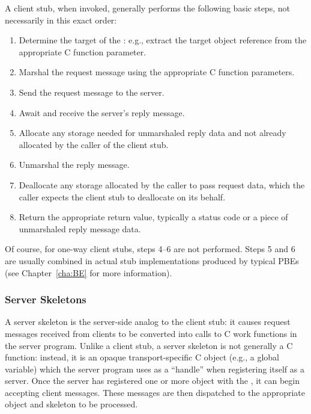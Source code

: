 A client stub, when invoked, generally performs the following basic steps, not
necessarily in this exact order:

\begin{enumerate}
  \item Determine the target of the \RPC{}: e.g., extract the target object
  reference from the appropriate C function parameter.

  \item Marshal the request message using the appropriate C function
  parameters.

  \item Send the request message to the server.

  \item Await and receive the server's reply message.

  \item Allocate any storage needed for unmarshaled reply data and not already
  allocated by the caller of the client stub.

  \item Unmarshal the reply message.

  \item Deallocate any storage allocated by the caller to pass request data,
  which the caller expects the client stub to deallocate on its behalf.

  \item Return the appropriate return value, typically a status code or a piece
  of unmarshaled reply message data.
\end{enumerate}

Of course, for one-way client stubs, steps 4--6 are not performed.  Steps 5 and
6 are usually combined in actual stub implementations produced by typical PBEs
(see Chapter~\ref{cha:BE} for more information).



\subsubsection{Server Skeletons}

A server skeleton is the server-side analog to the client stub: it causes
request messages received from clients to be converted into calls to C work
functions in the server program.  Unlike a client stub, a server skeleton is
not generally a C function: instead, it is an opaque transport-specific C
object (e.g., a global variable) which the server program uses as a ``handle''
when registering itself as a server.  Once the server has registered one or
more object with the \ORB{}, it can begin accepting client messages.  These
messages are then dispatched to the appropriate object and skeleton to be
processed.

